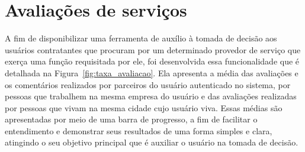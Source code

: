 \section{Avaliações de serviços}

A fim de disponibilizar uma ferramenta de auxílio à tomada de decisão aos usuários contratantes que procuram por um determinado provedor de serviço que exerça uma função requisitada por ele, foi desenvolvida essa funcionalidade que é detalhada na Figura~\ref{fig:taxa_avaliacao}. Ela apresenta a média das avaliações e os comentários realizados por parceiros do usuário autenticado no sistema, por pessoas que trabalhem na mesma empresa do usuário e das avaliações realizadas por pessoas que vivam na mesma cidade cujo usuário viva. Essas médias são apresentadas por meio de uma barra de progresso, a fim de facilitar o entendimento e demonstrar seus resultados de uma forma simples e clara, atingindo o seu objetivo principal que é auxiliar o usuário na tomada de decisão.